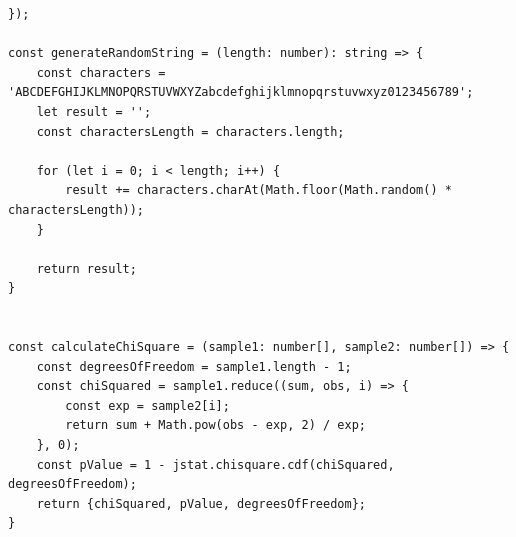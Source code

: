 \begin{lstlisting}[style=typescript,caption=Timing test for Hash Comparision,label=apendix:timing_test]
});

const generateRandomString = (length: number): string => {
    const characters = 'ABCDEFGHIJKLMNOPQRSTUVWXYZabcdefghijklmnopqrstuvwxyz0123456789';
    let result = '';
    const charactersLength = characters.length;

    for (let i = 0; i < length; i++) {
        result += characters.charAt(Math.floor(Math.random() * charactersLength));
    }

    return result;
}


const calculateChiSquare = (sample1: number[], sample2: number[]) => {
    const degreesOfFreedom = sample1.length - 1;
    const chiSquared = sample1.reduce((sum, obs, i) => {
        const exp = sample2[i];
        return sum + Math.pow(obs - exp, 2) / exp;
    }, 0);
    const pValue = 1 - jstat.chisquare.cdf(chiSquared, degreesOfFreedom);
    return {chiSquared, pValue, degreesOfFreedom};
}

\end{lstlisting}


